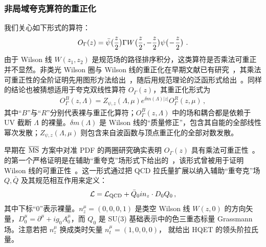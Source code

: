 \subsubsection{非局域夸克算符的重正化}

我们关心如下形式的算符：
\begin{equation}
	O_\Gamma(z)=\bar{\psi}\big({z\over2}\big)\Gamma W\big({z\over2},-{z\over2}\big)\psi\big(\!-\!{z\over2}\big) \ .
\end{equation}
由于 Wilson 线 $W(z_1,z_2)$ 是规范场的路径排序积分，这类算符是否乘法可重正并不显然。非类光 Wilson 圈与 Wilson 线的重正化在早期文献已有研究~\cite{Dotsenko:1979wb,Craigie:1980qs}，其乘法可重正性的全阶证明先用图形方法给出~\cite{Dotsenko:1979wb,Craigie:1980qs}，随后用规范理论的泛函形式给出~\cite{Dorn:1986dt}。同样的结论也被猜想适用于夸克双线性算符 $O_\Gamma(z)$，其重正化形式为~\cite{Musch:2010ka,Ishikawa:2016znu,Chen:2016fxx}
\begin{align} \label{eq:schemeren}
	O^B_\Gamma(z,\Lambda)=Z_{\psi,z}(\Lambda,\mu)e^{\delta m(\Lambda)|z|} O^R_\Gamma(z,\mu)\,,
\end{align}
其中``$B$''与``$R$''分别代表裸与重正化算符；$O^B_\Gamma(z,\Lambda)$ 中的场和耦合都是依赖于 UV 截断 $\Lambda$ 的裸量。$\delta m(\Lambda)$ 是 Wilson 线的``质量修正''，包含其自能的全部线性幂次发散；$Z_{\psi,z}(\Lambda,\mu)$ 则包含来自波函数与顶点重正化的全部对数发散。

早期在 ${\overline{\rm MS}}$ 方案中对准 PDF 的两圈研究确实表明 $O_\Gamma(z)$ 具有乘法可重正性~\cite{Ji:2015jwa}。 的第一个严格证明是在辅助``重夸克''场形式下给出的~\cite{Ji:2017oey,Green:2017xeu}，该形式曾被用于证明 Wilson 线的可重正性~\cite{Samuel:1978iy,Gervais:1979fv,Arefeva:1980zd,Dorn:1986dt}。这一形式通过把 QCD 拉氏量扩展以纳入辅助``重夸克''场 $Q,\bar{Q}$ 及其规范相互作用来定义：
\begin{align} \label{eq:hqet}
	{\cal L} = {\cal L}_{\rm QCD} + \bar{Q}_0in_z\cdot D_0 Q_0\,,
\end{align}
其中下标``0''表示裸量。$n_z^\mu=(0,0,0,1)$ 是类空 Wilson 线 $W(z,0)$ 的方向矢量，$D_{0}^\mu = \partial^\mu + ig_0A_{0}^\mu$，而 $Q_0$ 是 SU(3) 基础表示中的色三重态标量 Grassmann 场。注意若把 $n_z^\mu$ 换成类时矢量 $n_t^\mu=(1,0,0,0)$， 就给出 HQET 的领头阶拉氏量。

